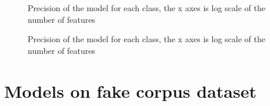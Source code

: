 \begin{figure}[]
 \centering
 \caption{Precision of the model for each class, the x axes is log scale of the number of features}
 \label{fig:chap3:max_feature1}
\end{figure}
\begin{figure}[]
 \centering
 \caption{Precision of the model for each class, the x axes is log scale of the number of features}
 \label{fig:chap3:max_feature2}
\end{figure}
\section{Models on fake corpus dataset}
